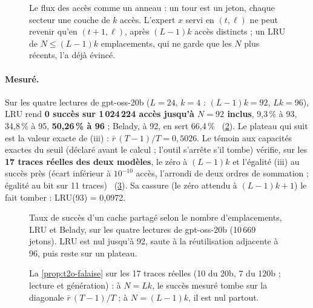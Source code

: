 \begin{figure}[ht]
\centering
\SchemaCchAnneau
\caption[La falaise du LRU partagé]{Le flux des accès comme un anneau : un tour est un jeton, chaque secteur une couche de $k$ accès. L'expert $x$ servi en $(t, \ell)$ ne peut revenir qu'en $(t+1, \ell)$, après $(L-1)k$ accès distincts ; un LRU de $N \le (L-1)k$ emplacements, qui ne garde que les $N$ plus récents, l'a déjà évincé.}
\label{fig:t2o-anneau}
\end{figure}

\paragraph{Mesuré.} Sur les quatre lectures de gpt-oss-20b ($L = 24$, $k = 4$ : $(L-1)k = 92$, $Lk = 96$), LRU rend \textbf{0 succès sur 1\,024\,224 accès jusqu'à $N = 92$ inclus}, 9,3\,\% à 93, 34,8\,\% à 95, \textbf{50,26\,\% à 96} ; Belady, à 92, en sert 66,4\,\% \mes~(\cref{fig:t2o-falaise}). Le plateau qui suit est la valeur exacte de (iii) : $\bar r\,(T-1)/T = 0{,}5026$. Le témoin aux capacités exactes du seuil (déclaré avant le calcul ; l'outil s'arrête s'il tombe) vérifie, sur les \textbf{17 traces réelles des deux modèles}, le zéro à $(L-1)k$ et l'égalité (iii) au succès près (écart inférieur à $10^{-10}$ accès, l'arrondi de deux ordres de sommation ; égalité au bit sur 11 traces) \mes~(\cref{fig:t2o-prop}). Sa cassure (le zéro attendu à $(L-1)k + 1$) le fait tomber : LRU(93) = 0,0972.

\begin{figure}[ht]
\centering
\GrapheCchFalaise
\caption[La falaise mesurée]{Taux de succès d'un cache partagé selon le nombre d'emplacements, LRU et Belady, sur les quatre lectures de gpt-oss-20b (10\,669 jetons). LRU est nul jusqu'à 92, saute à la réutilisation adjacente à 96, puis reste sur un plateau.}
\label{fig:t2o-falaise}
\end{figure}

\begin{figure}[ht]
\centering
\GrapheCchProp
\caption[La proposition vérifiée sur 17 traces]{La \cref{prop:t2o-falaise} sur les 17 traces réelles (10 du 20b, 7 du 120b ; lecture et génération) : à $N = Lk$, le succès mesuré tombe sur la diagonale $\bar r\,(T-1)/T$ ; à $N = (L-1)k$, il est nul partout.}
\label{fig:t2o-prop}
\end{figure}

